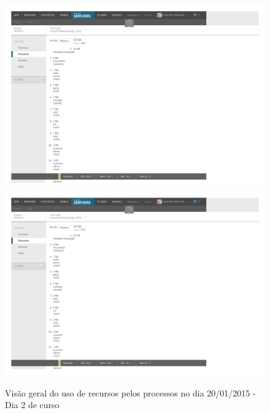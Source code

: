 \documentclass[
	12pt,				%
	oneside,			%
	a4paper,			%
	english,			%
	brazil				%
	]{abntex2ppgsi}
\begin{document}
\begin{apendicesenv}
\begin{figure}[h]
\centering
\caption{Visão geral do uso de recursos pelos processos no dia 20/01/2015 - Dia 2 de curso}
\includegraphics[page=2,width=1.0\textwidth]{relatorios/20-01-15/process-inspector_cropped.pdf} 
\includegraphics[page=3,width=1.0\textwidth]{relatorios/20-01-15/process-inspector_cropped.pdf} 
\label{fig:recursos_dia2_4} 
\end{figure}





\end{apendicesenv}
\end{document}
